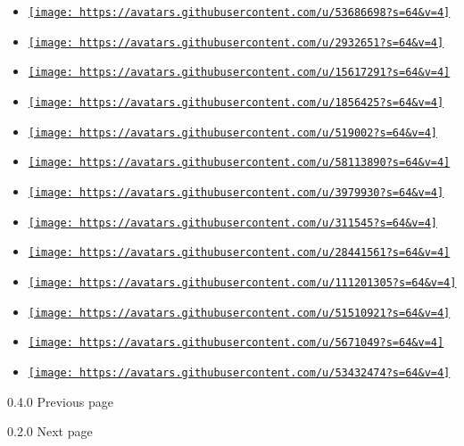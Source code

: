 \begin{itemize}
\item
  \href{https://github.com/astrale-sharp}{\texttt{[image: https://avatars.githubusercontent.com/u/53686698?s=64\&v=4]}}
\item
  \href{https://github.com/birktj}{\texttt{[image: https://avatars.githubusercontent.com/u/2932651?s=64\&v=4]}}
\item
  \href{https://github.com/dccsillag}{\texttt{[image: https://avatars.githubusercontent.com/u/15617291?s=64\&v=4]}}
\item
  \href{https://github.com/goggle}{\texttt{[image: https://avatars.githubusercontent.com/u/1856425?s=64\&v=4]}}
\item
  \href{https://github.com/johannes-wolf}{\texttt{[image: https://avatars.githubusercontent.com/u/519002?s=64\&v=4]}}
\item
  \href{https://github.com/mattfbacon}{\texttt{[image: https://avatars.githubusercontent.com/u/58113890?s=64\&v=4]}}
\item
  \href{https://github.com/michidk}{\texttt{[image: https://avatars.githubusercontent.com/u/3979930?s=64\&v=4]}}
\item
  \href{https://github.com/neunenak}{\texttt{[image: https://avatars.githubusercontent.com/u/311545?s=64\&v=4]}}
\item
  \href{https://github.com/pan93412}{\texttt{[image: https://avatars.githubusercontent.com/u/28441561?s=64\&v=4]}}
\item
  \href{https://github.com/rpitasky}{\texttt{[image: https://avatars.githubusercontent.com/u/111201305?s=64\&v=4]}}
\item
  \href{https://github.com/thinety}{\texttt{[image: https://avatars.githubusercontent.com/u/51510921?s=64\&v=4]}}
\item
  \href{https://github.com/tranzystorekk}{\texttt{[image: https://avatars.githubusercontent.com/u/5671049?s=64\&v=4]}}
\item
  \href{https://github.com/werifu}{\texttt{[image: https://avatars.githubusercontent.com/u/53432474?s=64\&v=4]}}
\end{itemize}

\href{/docs/changelog/0.4.0/}{\pandocbounded{}}

{ 0.4.0 } { Previous page }

\href{/docs/changelog/0.2.0/}{\pandocbounded{}}

{ 0.2.0 } { Next page }
